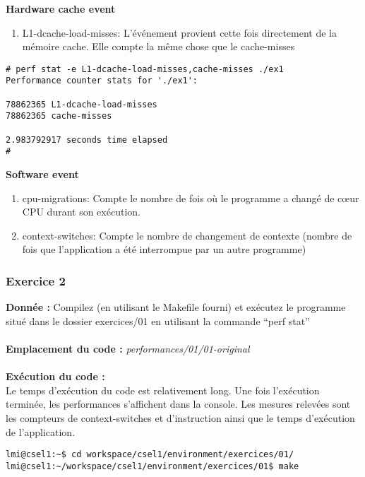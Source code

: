 \textbf{Hardware cache event}
\begin{enumerate}
	\item L1-dcache-load-misses: L'événement provient cette fois directement de la mémoire cache. Elle compte la même chose que le cache-misses
\end{enumerate}
\begin{lstlisting}
# perf stat -e L1-dcache-load-misses,cache-misses ./ex1                         
Performance counter stats for './ex1':                                         

78862365 L1-dcache-load-misses                                        
78862365 cache-misses                                                 

2.983792917 seconds time elapsed                                         
# 
\end{lstlisting}
\textbf{Software event}
\begin{enumerate}
	\item cpu-migrations: Compte le nombre de fois où le programme a changé de cœur CPU durant son exécution.
	\item context-switches: Compte le nombre de changement de contexte (nombre de fois que l'application a été interrompue par un autre programme)
\end{enumerate}

\subsubsection{Exercice 2}
\textbf{Donnée : } Compilez	(en	utilisant	le	Makefile	fourni)	et	exécutez	le	programme	situé	dans	le	dossier	exercices/01	
en	utilisant	la	commande	“perf	stat”
\\\\
\textbf{Emplacement du code : }\textit{performances/01/01-original}\\\\
\textbf{Exécution du code : } \\
Le temps d'exécution du code est relativement long. Une fois l'exécution terminée, les performances s'affichent dans la console. Les mesures relevées sont les compteurs de context-switches et d'instruction ainsi que le temps d'exécution de l'application.\\
\begin{lstlisting}
lmi@csel1:~$ cd workspace/csel1/environment/exercices/01/
lmi@csel1:~/workspace/csel1/environment/exercices/01$ make
\end{lstlisting}

